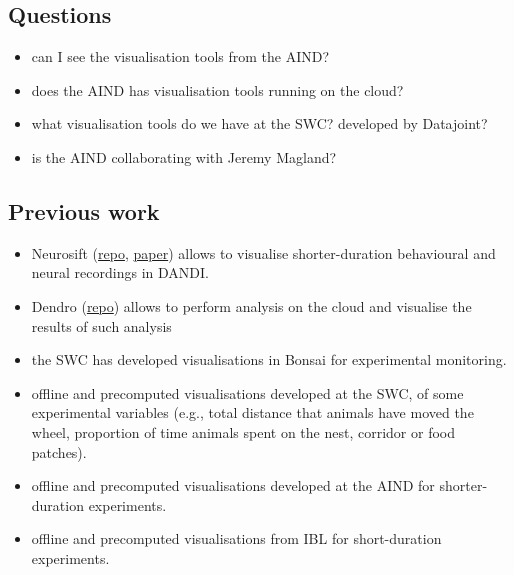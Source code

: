 \subsection{Questions}

\begin{itemize}

    \item can I see the visualisation tools from the AIND?

    \item does the AIND has visualisation tools running on the cloud?

    \item what visualisation tools do we have at the SWC? developed by
    Datajoint?

    \item is the AIND collaborating with Jeremy Magland?

\end{itemize}

\subsection{Previous work}

\begin{itemize}

    \item Neurosift
        (\href{https://github.com/flatironinstitute/neurosift}{repo},
        \href{https://joss.theoj.org/papers/10.21105/joss.06590}{paper}) allows to
    visualise shorter-duration behavioural and neural recordings in DANDI.

    \item Dendro (\href{https://github.com/magland/dendro}{repo}) allows to
    perform analysis on the cloud and visualise the results of such analysis

    \item the SWC has developed visualisations in Bonsai for experimental
    monitoring.

    \item offline and precomputed visualisations developed at the SWC, of some
    experimental variables (e.g., total distance that animals have moved the
    wheel, proportion of time animals spent on the nest, corridor or food
    patches).

    \item offline and precomputed visualisations developed at the AIND for
    shorter-duration experiments.

    \item offline and precomputed visualisations from IBL for short-duration
    experiments.

\end{itemize}

